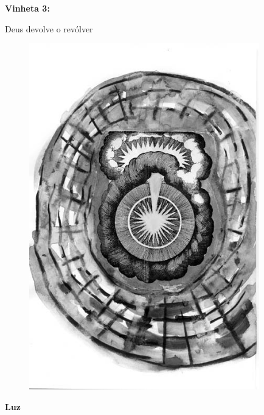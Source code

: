 \pagebreak

\begin{absolutelynopagebreak}
\textbf{Vinheta 3:}

Deus devolve o revólver

\thispagestyle{empty}

\begin{vplace}
\begin{figure}[H]
\begin{adjustwidth}{8cm}{}
  \vspace*{4cm}
  \includegraphics[width=100mm]{./imgs/caparc4.JPG}  
\end{adjustwidth}

\end{figure}
\end{vplace}

\end{absolutelynopagebreak}

\pagebreak

\textbf{Luz}

